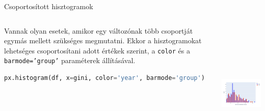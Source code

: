 \documentclass[english, aspectratio=169]{beamer}
\begin{document}
	\begin{frame}[fragile]{Csoportosított hisztogramok}
		\begin{columns}
			\begin{column}{.5\textwidth}
				Vannak olyan esetek, amikor egy változónak több csoportját egymás mellett szükséges megmutatni. Ekkor a hisztogramokat lehetséges csoportosítani adott értékek szerint, a \texttt{color} és a \texttt{barmode='group'} paraméterek állításával.\par\medskip
				\begin{lstlisting}[language=python]
px.histogram(df, x=gini, color='year', barmode='group')
				\end{lstlisting}
			\end{column}
			\begin{column}{.5\textwidth}
				\begin{center}
					\includegraphics[width=7cm, height=7cm, keepaspectratio]{images/freq_6.png}
				\end{center}
			\end{column}
		\end{columns}
	\end{frame}
	
\end{document}
